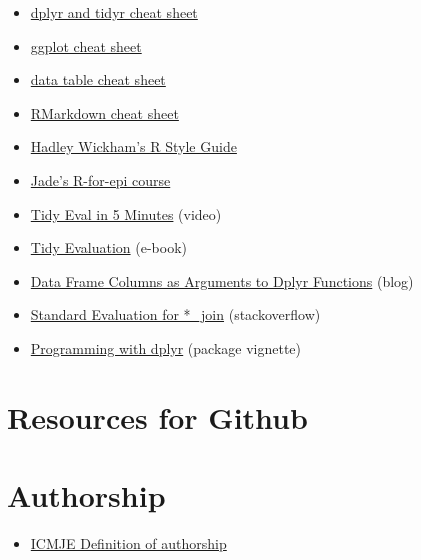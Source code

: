 \documentclass[]{book}
\providecommand{\tightlist}{%
  \setlength{\itemsep}{0pt}\setlength{\parskip}{0pt}}
\begin{document}
\begin{itemize}
\tightlist
\item
  \href{https://www.rstudio.com/wp-content/uploads/2015/02/data-wrangling-cheatsheet.pdf}{dplyr
  and tidyr cheat sheet}
\item
  \href{https://www.rstudio.com/wp-content/uploads/2015/03/ggplot2-cheatsheet.pdf}{ggplot
  cheat sheet}
\item
  \href{https://s3.amazonaws.com/assets.datacamp.com/blog_assets/datatable_Cheat_Sheet_R.pdf}{data
  table cheat sheet}
\item
  \href{https://www.rstudio.com/wp-content/uploads/2015/02/rmarkdown-cheatsheet.pdf}{RMarkdown
  cheat sheet}
\item
  \href{http://adv-r.had.co.nz/Style.html}{Hadley Wickham's R Style
  Guide}
\item
  \href{https://ucb-epi-r.github.io}{Jade's R-for-epi course}
\item
  \href{https://www.youtube.com/watch?v=nERXS3ssntw}{Tidy Eval in 5
  Minutes} (video)
\item
  \href{https://tidyeval.tidyverse.org/index.html}{Tidy Evaluation}
  (e-book)
\item
  \href{https://www.brodrigues.co/blog/2016-07-18-data-frame-columns-as-arguments-to-dplyr-functions/}{Data
  Frame Columns as Arguments to Dplyr Functions} (blog)
\item
  \href{https://stackoverflow.com/questions/28125816/r-standard-evaluation-for-join-dplyr}{Standard
  Evaluation for *\_join} (stackoverflow)
\item
  \href{https://dplyr.tidyverse.org/articles/programming.html}{Programming
  with dplyr} (package vignette)
\end{itemize}

\section{Resources for Github}\label{resources-for-github}

\section{Authorship}\label{authorship}

\begin{itemize}
\tightlist
\item
  \href{http://www.icmje.org/recommendations/browse/roles-and-responsibilities/defining-the-role-of-authors-and-contributors.html}{ICMJE
  Definition of authorship}
\end{itemize}


\end{document}
